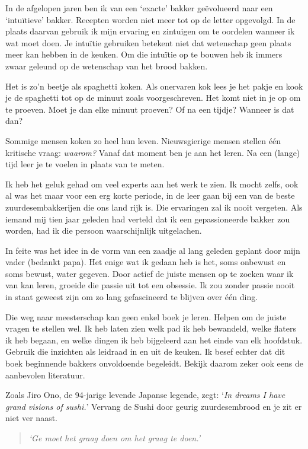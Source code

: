 \documentclass[
  11pt,
  dutch,
]{memoir}
\begin{document}
In de afgelopen jaren ben ik van een `exacte' bakker geëvolueerd naar
een `intuïtieve' bakker. Recepten worden niet meer tot op de letter
opgevolgd. In de plaats daarvan gebruik ik mijn ervaring en zintuigen om
te oordelen wanneer ik wat moet doen. Je intuïtie gebruiken betekent
niet dat wetenschap geen plaats meer kan hebben in de keuken. Om die
intuïtie op te bouwen heb ik immers zwaar geleund op de wetenschap van
het brood bakken.

Het is zo'n beetje als spaghetti koken. Als onervaren kok lees je het
pakje en kook je de spaghetti tot op de minuut zoals voorgeschreven. Het
komt niet in je op om te proeven. Moet je dan elke minuut proeven? Of na
een tijdje? Wanneer is dat dan?

Sommige mensen koken zo heel hun leven. Nieuwsgierige mensen stellen één
kritische vraag: \emph{waarom?} Vanaf dat moment ben je aan het leren.
Na een (lange) tijd leer je te voelen in plaats van te meten.

Ik heb het geluk gehad om veel experts aan het werk te zien. Ik mocht
zelfs, ook al was het maar voor een erg korte periode, in de leer gaan
bij een van de beste zuurdesembakkerijen die ons land rijk is. Die
ervaringen zal ik nooit vergeten. Als iemand mij tien jaar geleden had
verteld dat ik een gepassioneerde bakker zou worden, had ik die persoon
waarschijnlijk uitgelachen.

In feite was het idee in de vorm van een zaadje al lang geleden geplant
door mijn vader (bedankt papa). Het enige wat ik gedaan heb is het, soms
onbewust en soms bewust, water gegeven. Door actief de juiste mensen op
te zoeken waar ik van kan leren, groeide die passie uit tot een
obsessie. Ik zou zonder passie nooit in staat geweest zijn om zo lang
gefascineerd te blijven over één ding.

Die weg naar meesterschap kan geen enkel boek je leren. Helpen om de
juiste vragen te stellen wel. Ik heb laten zien welk pad ik heb
bewandeld, welke flaters ik heb begaan, en welke dingen ik heb
bijgeleerd aan het einde van elk hoofdstuk. Gebruik die inzichten als
leidraad in en uit de keuken. Ik besef echter dat dit boek beginnende
bakkers onvoldoende begeleidt. Bekijk daarom zeker ook eens de
aanbevolen literatuur.

Zoals Jiro Ono, de 94-jarige levende Japanse legende, zegt: `\emph{In
dreams I have grand visions of sushi.}' Vervang de Sushi door geurig
zuurdesembrood en je zit er niet ver naast.

\begin{quote}
\emph{`Ge moet het graag doen om het graag te doen.'}
\end{quote}
\end{document}
